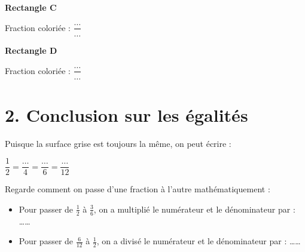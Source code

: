 \documentclass[a4paper]{book}
\begin{document}
    \noindent
    \begin{minipage}{0.45\textwidth}
        \centering
        \textbf{Rectangle C}\\ \vspace{0.2cm}
        
        \vspace{0.3cm}
        Fraction coloriée : $\dfrac{\dots}{\dots}$
    \end{minipage}
    \hfill
    \begin{minipage}{0.45\textwidth}
        \centering
        \textbf{Rectangle D}\\ \vspace{0.2cm}
        
        \vspace{0.3cm}
        Fraction coloriée : $\dfrac{\dots}{\dots}$
    \end{minipage}
    
\section*{2. Conclusion sur les égalités}
    
    Puisque la surface grise est toujours la même, on peut écrire :
    \begin{center}
        \Large $\dfrac{1}{2} = \dfrac{\dots}{4} = \dfrac{\dots}{6} = \dfrac{\dots}{12}$
    \end{center}
    
    \begin{exercice}
        Regarde comment on passe d'une fraction à l'autre mathématiquement :
        \begin{itemize}
            \item Pour passer de $\frac{1}{2}$ à $\frac{3}{6}$, on a multiplié le numérateur et le dénominateur par : \dots\dots
            \item Pour passer de $\frac{6}{12}$ à $\frac{1}{2}$, on a divisé le numérateur et le dénominateur par : \dots\dots
        \end{itemize}
    \end{exercice}
    
\end{document}
